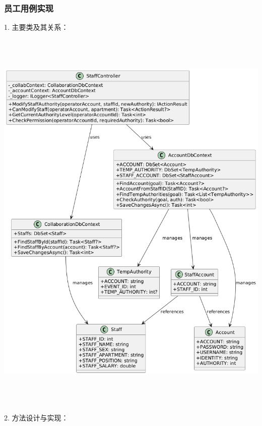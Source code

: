 \documentclass[]{article}
\let\oldincludegraphics\includegraphics
\renewcommand{\includegraphics}[2][]{%
  \begin{center}\oldincludegraphics[#1]{#2}\end{center}%
}
\begin{document}
\hypertarget{ux5458ux5de5ux7528ux4f8bux5b9eux73b0}{%
  \subsubsection{员工用例实现}\label{ux5458ux5de5ux7528ux4f8bux5b9eux73b0}}

1. 主要类及其关系：

\includegraphics[width=6.23958in,height=7.50903in]{media/media/image14.png}

2. 方法设计与实现：
\end{document}
